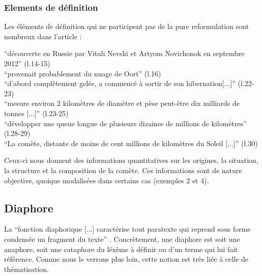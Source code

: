 \documentclass[a4paper,10pt]{article}
\begin{document}
		\subsubsection{Elements de définition}
			Les éléments de définition qui ne participent pas de la pure reformulation sont nombreux dans l'article :
			\begin{center}
				\footnotesize
				\begin{minipage}{0.7\textwidth}
					``découverte en Russie par Vitali Nevski et Artyom Novichonok en septembre 2012'' (l.14-15)\\
					``provenait probablement du nuage de Oort'' (l.16) \\
					``d'abord complètement gelée, a commencé à sortir de son hibernation[...]'' (l.22-23) \\
					``mesure environ 2 kilomètres de diamètre et pèse peut-être dix milliards de tonnes [...]'' (l.23-25)\\
					``développer une queue longue de plusieurs dizaines de millions de kilomètres'' (l.28-29)\\
					``La comète, distante de moins de cent millions de kilomètres du Soleil [...]'' (l.30)
				\end{minipage}
			\end{center}
			Ceux-ci nous donnent des informations quantitatives sur les origines, la situation, la structure et la composition de la comète. Ces informations sont de nature objective, quoique modalisées dans certains cas (exemples 2 et 4).
	\subsection{Diaphore} \label{diaphore}
		La ``fonction diaphorique [...] caractérise tout paratexte qui reprend sous forme condensée un fragment du texte'' \cite{Peraya1994}. Concrètement, une diaphore est soit une anaphore, soit une cataphore du léxème à définir ou d'un terme qui lui fait référence. Comme nous le verrons plus loin, cette notion est très liée à celle de thématisation.\\
\end{document}
